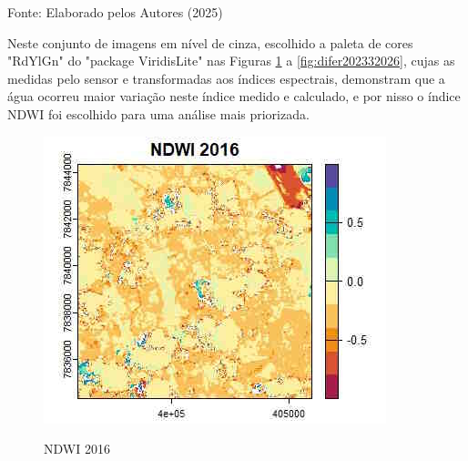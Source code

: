  			\begin{center}
 				Fonte:   Elaborado pelos Autores (2025)
 			\end{center}
 \hspace*{1.25 cm} Neste conjunto de imagens em nível de cinza,  escolhido a paleta de cores "RdYlGn" do "package ViridisLite" nas Figuras \ref{fig:rplot-ndwi2016} a \ref{fig:difer202332026}, cujas as  medidas pelo sensor e transformadas aos índices espectrais, demonstram que a água ocorreu maior variação neste índice medido e calculado, e por nisso o índice NDWI  foi escolhido para uma análise mais priorizada.   \\
 			\begin{minipage}[t!]{0.31\textwidth}
 				\begin{figure}[H]
 					\centering \small \caption{NDWI 2016}
 					\includegraphics[width=0.97\linewidth]{FIGURAS/Rplotndwi2016}
 					\label{fig:rplot-ndwi2016}
 				\end{figure}			
 				
 			\end{minipage}\hfill
